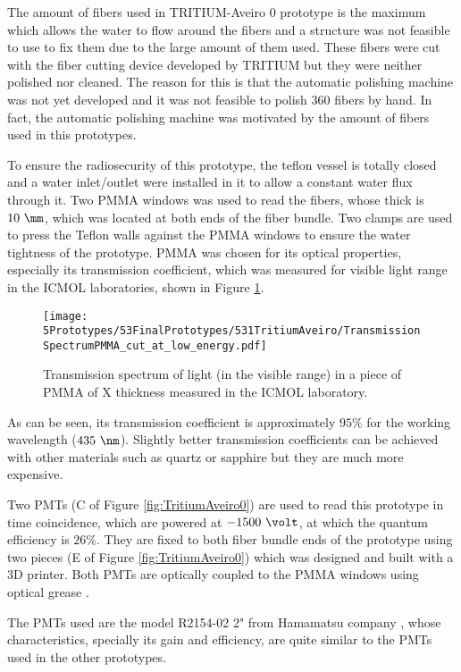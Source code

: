 The amount of fibers used in TRITIUM-Aveiro 0 prototype is the maximum which allows the water to flow around the fibers and a structure was not feasible to use to fix them due to the large amount of them used. These fibers were cut with the fiber cutting device developed by TRITIUM but they were neither polished nor cleaned. The reason for this is that the automatic polishing machine was not yet developed and it was not feasible to polish 360 fibers by hand. In fact, the automatic polishing machine was motivated by the amount of fibers used in this prototypes.

To ensure the radiosecurity of this prototype, the teflon vessel is totally closed and  a water inlet/outlet were installed in it to allow a constant water flux through it. Two PMMA windows was used to read the fibers, whose thick is $10~\mm$, which was located at both ends of the fiber bundle. Two clamps are used to press the Teflon walls against the PMMA windows to ensure the water tightness of the prototype. PMMA was chosen for its optical properties, especially its transmission coefficient, which was measured for visible light range in the ICMOL laboratories, shown in Figure \ref{fig:PMMATransmissionSpectrum}.

\begin{figure}[h]
\centering
\texttt{[image: 5Prototypes/53FinalPrototypes/531TritiumAveiro/TransmissionSpectrumPMMA\_cut\_at\_low\_energy.pdf]}
\caption{Transmission spectrum of light (in the visible range) in a piece of PMMA of X thickness measured in the ICMOL laboratory. \label{fig:PMMATransmissionSpectrum}}
\end{figure}	

As can be seen, its transmission coefficient is approximately $95\%$ for the working wavelength ($435~\nm$). Slightly better transmission coefficients can be achieved with other materials such as quartz or sapphire but they are much more expensive.

Two PMTs (C of Figure \ref{fig:TritiumAveiro0}) are used to read this prototype in time coincidence, which are powered at $-1500~\volt$, at which the quantum efficiency is $26\%$. They are fixed to both fiber bundle ends of the prototype using two pieces (E of Figure \ref{fig:TritiumAveiro0}) which was designed and built with a 3D printer. Both PMTs are optically coupled to the PMMA windows using optical grease \cite{OpticalGrease}.

The PMTs used are the model R2154-02 2" from Hamamatsu company \cite{DataSheetPMTsAveiro}, whose characteristics, specially its gain and efficiency, are quite similar to the PMTs used in the other prototypes.


